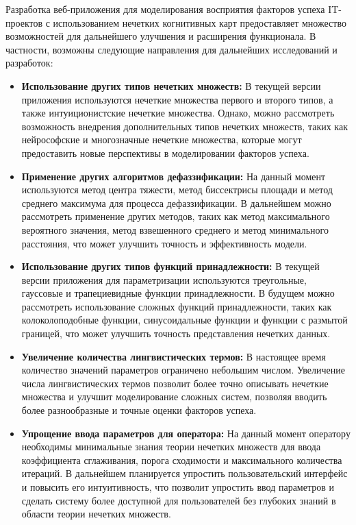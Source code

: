 \documentclass{article}
\begin{document}
    Разработка веб-приложения для моделирования восприятия факторов успеха IT-проектов с использованием нечетких когнитивных карт предоставляет множество возможностей для дальнейшего улучшения и расширения функционала. В частности, возможны следующие направления для дальнейших исследований и разработок:

    \begin{itemize}
        \item \textbf{Использование других типов нечетких множеств:}
        В текущей версии приложения используются нечеткие множества первого и второго типов, а также интуиционистские нечеткие множества. Однако, можно рассмотреть возможность внедрения дополнительных типов нечетких множеств, таких как нейрософские и многозначные нечеткие множества, которые могут предоставить новые перспективы в моделировании факторов успеха.

        \item \textbf{Применение других алгоритмов дефаззификации:}
        На данный момент используются метод центра тяжести, метод биссектрисы площади и метод среднего максимума для процесса дефаззификации. В дальнейшем можно рассмотреть применение других методов, таких как метод максимального вероятного значения, метод взвешенного среднего и метод минимального расстояния, что может улучшить точность и эффективность модели.

        \item \textbf{Использование других типов функций принадлежности:}
        В текущей версии приложения для параметризации используются треугольные, гауссовые и трапециевидные функции принадлежности. В будущем можно рассмотреть использование сложных функций принадлежности, таких как колоколоподобные функции, синусоидальные функции и функции с размытой границей, что может улучшить точность представления нечетких данных.

        \item \textbf{Увеличение количества лингвистических термов:}
        В настоящее время количество значений параметров ограничено небольшим числом. Увеличение числа лингвистических термов позволит более точно описывать нечеткие множества и улучшит моделирование сложных систем, позволяя вводить более разнообразные и точные оценки факторов успеха.

        \item \textbf{Упрощение ввода параметров для оператора:}
        На данный момент оператору необходимы минимальные знания теории нечетких множеств для ввода коэффициента сглаживания, порога сходимости и максимального количества итераций. В дальнейшем планируется упростить пользовательский интерфейс и повысить его интуитивность, что позволит упростить ввод параметров и сделать систему более доступной для пользователей без глубоких знаний в области теории нечетких множеств.
    \end{itemize}
\end{document}
